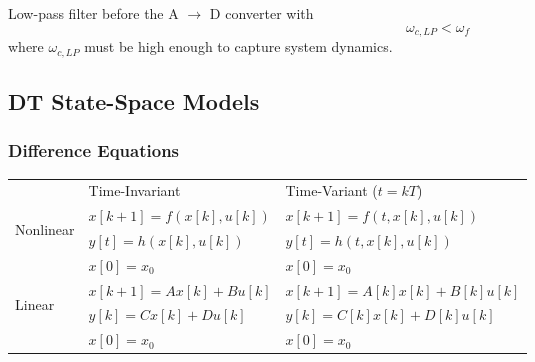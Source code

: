 
Low-pass filter before the A $\rightarrow$ D converter with
\begin{equation*}
    \omega_{c,LP} < \omega_f
\end{equation*}
where $\omega_{c,LP}$ must be high enough to capture system dynamics.

\subsection{DT State-Space Models}
\subsubsection{Difference Equations}

\renewcommand{\arraystretch}{1.3}
\setlength{\oldtabcolsep}{\tabcolsep}\setlength\tabcolsep{3pt}

\begin{tabularx}{\linewidth}{@{}lll@{}}
                                                             & Time-Invariant          & Time-Variant ($t = kT$)      \\
    \cmidrule{2-3}
    \multirow{3}{*}{\begin{sideways}Nonlinear\end{sideways}} & $x[k+1] = f(x[k],u[k])$ & $x[k+1] = f(t,x[k],u[k])$    \\
                                                             & $y[t] = h(x[k],u[k])$   & $y[t] = h(t,x[k],u[k])$      \\
                                                             & $x[0]=x_0$              & $x[0]=x_0$                   \\
    \cmidrule{2-3}
    \multirow{3}{*}{\begin{sideways}Linear\end{sideways}}    & $x[k+1] = Ax[k]+Bu[k]$  & $x[k+1] = A[k]x[k]+B[k]u[k]$ \\
                                                             & $y[k] = Cx[k]+Du[k]$    & $y[k] = C[k]x[k]+D[k]u[k]$   \\
                                                             & $x[0] = x_0$            & $x[0]=x_0$
\end{tabularx}

\renewcommand{\arraystretch}{1}
\setlength{\tabcolsep}{\oldtabcolsep}


